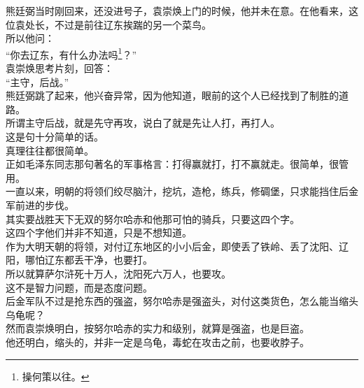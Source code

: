 \begin{multicols}{\theparacolNo}
熊廷弼当时刚回来，还没进号子，袁崇焕上门的时候，他并未在意。在他看来，这位袁处长，不过是前往辽东挨踹的另一个菜鸟。\\

所以他问：\\

“你去辽东，有什么办法吗\footnote{操何策以往。}？”\\

袁崇焕思考片刻，回答：\\

“主守，后战。”\\

熊廷弼跳了起来，他兴奋异常，因为他知道，眼前的这个人已经找到了制胜的道路。\\

所谓主守后战，就是先守再攻，说白了就是先让人打，再打人。\\

这是句十分简单的话。\\

真理往往都很简单。\\

正如毛泽东同志那句著名的军事格言：打得赢就打，打不赢就走。很简单，很管用。\\

一直以来，明朝的将领们绞尽脑汁，挖坑，造枪，练兵，修碉堡，只求能挡住后金军前进的步伐。\\

其实要战胜天下无双的努尔哈赤和他那可怕的骑兵，只要这四个字。\\

这四个字他们并非不知道，只是不想知道。\\

作为大明天朝的将领，对付辽东地区的小小后金，即使丢了铁岭、丢了沈阳、辽阳，哪怕辽东都丢干净，也要打。\\

所以就算萨尔浒死十万人，沈阳死六万人，也要攻。\\

这不是智力问题，而是态度问题。\\

后金军队不过是抢东西的强盗，努尔哈赤是强盗头，对付这类货色，怎么能当缩头乌龟呢？\\

然而袁崇焕明白，按努尔哈赤的实力和级别，就算是强盗，也是巨盗。\\

他还明白，缩头的，并非一定是乌龟，毒蛇在攻击之前，也要收脖子。\\


\end{multicols}

